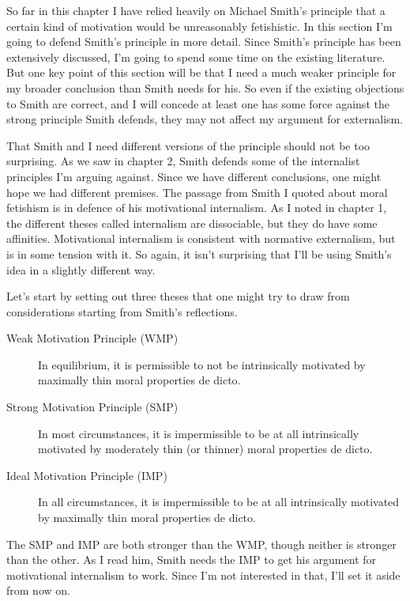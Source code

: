 So far in this chapter I have relied heavily on Michael Smith's principle that a certain kind of motivation would be unreasonably fetishistic. In this section I'm going to defend Smith's principle in more detail. Since Smith's principle has been extensively discussed, I'm going to spend some time on the existing literature. But one key point of this section will be that I need a much weaker principle for my broader conclusion than Smith needs for his. So even if the existing objections to Smith are correct, and I will concede at least one has some force against the strong principle Smith defends, they may not affect my argument for externalism.

That Smith and I need different versions of the principle should not be too surprising. As we saw in chapter 2, Smith defends some of the internalist principles I'm arguing against. Since we have different conclusions, one might hope we had different premises. The passage from Smith I quoted about moral fetishism is in defence of his motivational internalism. As I noted in chapter 1, the different theses called internalism are dissociable, but they do have some affinities. Motivational internalism is consistent with normative externalism, but is in some tension with it. So again, it isn't surprising that I'll be using Smith's idea in a slightly different way.

Let's start by setting out three theses that one might try to draw from considerations starting from Smith's reflections.

\begin{description}
\item[Weak Motivation Principle (WMP)]

In equilibrium, it is permissible to not be intrinsically motivated by maximally thin moral properties de dicto.

\item[Strong Motivation Principle (SMP)]

In most circumstances, it is impermissible to be at all intrinsically motivated by moderately thin (or thinner) moral properties de dicto.

\item[Ideal Motivation Principle (IMP)]

In all circumstances, it is impermissible to be at all intrinsically motivated by maximally thin moral properties de dicto.
\end{description}
The SMP and IMP are both stronger than the WMP, though neither is stronger than the other. As I read him, Smith needs the IMP to get his argument for motivational internalism to work. Since I'm not interested in that, I'll set it aside from now on.

